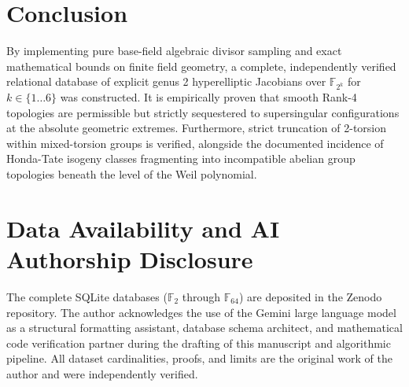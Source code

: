 \documentclass[letterpaper, 11pt]{article}
\begin{document}
\section{Conclusion}
By implementing pure base-field algebraic divisor sampling and exact mathematical bounds on finite field geometry, a complete, independently verified relational database of explicit genus 2 hyperelliptic Jacobians over $\mathbb{F}_{2^k}$ for $k \in \{1 \dots 6\}$ was constructed. It is empirically proven that smooth Rank-4 topologies are permissible but strictly sequestered to supersingular configurations at the absolute geometric extremes. Furthermore, strict truncation of 2-torsion within mixed-torsion groups is verified, alongside the documented incidence of Honda-Tate isogeny classes fragmenting into incompatible abelian group topologies beneath the level of the Weil polynomial. 

\section{Data Availability and AI Authorship Disclosure}
The complete SQLite databases ($\mathbb{F}_{2}$ through $\mathbb{F}_{64}$) are deposited in the Zenodo repository. The author acknowledges the use of the Gemini large language model \cite{Gemini2026} as a structural formatting assistant, database schema architect, and mathematical code verification partner during the drafting of this manuscript and algorithmic pipeline. All dataset cardinalities, proofs, and limits are the original work of the author and were independently verified.
\end{document}
